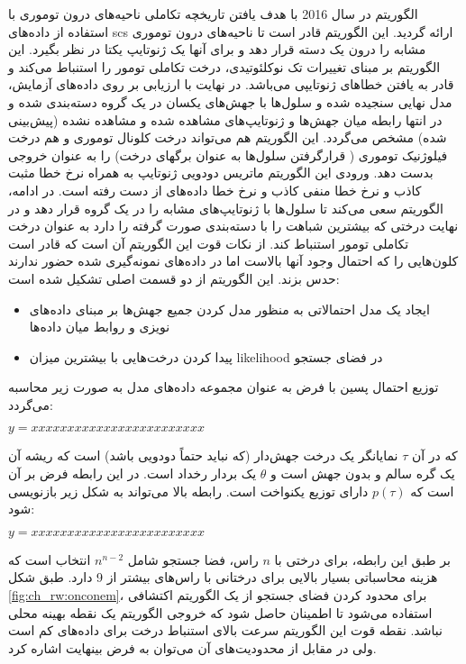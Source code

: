 الگوریتم  در سال 2016 با هدف یافتن تاریخچه تکاملی ناحیه‌های درون توموری با استفاده از داده‌های \gls{scs} ارائه گردید. این الگوریتم قادر است تا ناحیه‌های درون توموری مشابه را درون یک دسته قرار دهد و برای آنها یک ژنوتایپ یکتا در نظر بگیرد. این الگوریتم بر مبنای تغییرات تک نوکلئوتیدی، درخت تکاملی تومور را استنباط می‌کند و قادر به یافتن خطاهای ژنوتایپی می‌باشد. در نهایت با ارزیابی بر روی داده‌های آزمایش، مدل نهایی سنجیده شده و سلول‌ها با جهش‌های یکسان در یک گروه دسته‌بندی شده و در انتها رابطه میان جهش‌ها و ژنوتایپ‌های مشاهده شده و مشاهده نشده (پیش‌بینی شده) مشخص می‌گردد. این الگوریتم هم می‌تواند درخت کلونال توموری و هم درخت فیلوژنیک توموری ( قرارگرفتن سلول‌ها به عنوان برگهای درخت) را به عنوان خروجی بدست دهد. ورودی این الگوریتم ماتریس دودویی ژنوتایپ به همراه نرخ خطا مثبت کاذب و نرخ خطا منفی کاذب و نرخ خطا داده‌های از دست رفته است. در ادامه، الگوریتم سعی می‌کند تا سلول‌ها با ژنوتایپ‌های مشابه را در یک گروه قرار دهد و در نهایت درختی که بیشترین شباهت را با دسته‌بندی صورت گرفته را دارد به عنوان درخت تکاملی تومور استنباط کند. از نکات قوت این الگوریتم آن است که قادر است کلون‌هایی را که احتمال وجود آنها بالاست اما در داده‌های نمونه‌گیری شده حضور ندارند حدس بزند. این الگوریتم از دو قسمت اصلی تشکیل شده است: 


\begin{itemize}
	\item     ایجاد یک مدل احتمالاتی به منظور مدل کردن جمیع جهش‌ها بر مبنای داده‌های نویزی و روابط میان داده‌ها 
	\item	پیدا کردن درخت‌هایی با بیشترین میزان \gls{likelihood} در فضای جستجو 
\end{itemize}

توزیع احتمال پسین با فرض  به عنوان مجموعه داده‌های مدل به صورت زیر محاسبه می‌گردد: 

\begin{math}
	y=xxxxxxxxxxxxxxxxxxxxxxxx
\end{math}

که در آن $\tau$ نمایانگر یک درخت جهش‌دار (که نباید حتماً دودویی باشد) است که ریشه آن یک گره سالم و بدون جهش است و $\theta$ یک بردار رخداد است. در این رابطه فرض بر آن است که $p(\tau)$ دارای توزیع یکنواخت است. رابطه بالا می‌تواند به شکل زیر بازنویسی شود: 


\begin{math}
	y=xxxxxxxxxxxxxxxxxxxxxxxx
\end{math}


بر طبق این رابطه، برای درختی با  $n$ راس، فضا جستجو شامل $n^{n-2}$  انتخاب است که هزینه محاسباتی بسیار بالایی برای درختانی با راس‌های بیشتر از 9 دارد. طبق شکل \ref{fig:ch_rw:onconem}، برای محدود کردن فضای جستجو از یک الگوریتم اکتشافی استفاده می‌شود تا اطمینان حاصل شود که خروجی الگوریتم یک نقطه بهینه محلی نباشد. نقطه قوت این الگوریتم سرعت بالای استنباط درخت برای داده‌های کم است ولی در مقابل از محدودیت‌های آن می‌توان به فرض بینهایت اشاره کرد.


